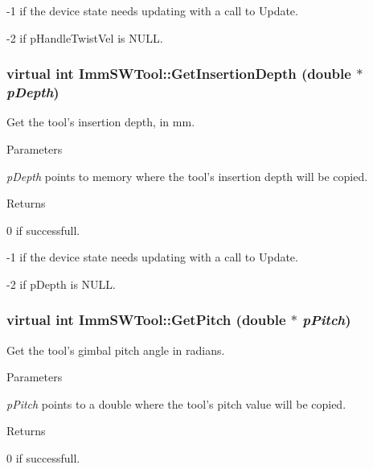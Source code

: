 -\/1 if the device state needs updating with a call to Update.

-\/2 if pHandleTwistVel is NULL. \hypertarget{classImmSWTool_ad51506f94f40337033fb62afd199005b}{
\subsubsection[{GetInsertionDepth}]{\setlength{\rightskip}{0pt plus 5cm}virtual int ImmSWTool::GetInsertionDepth (double $\ast$ {\em pDepth})}}
\label{classImmSWTool_ad51506f94f40337033fb62afd199005b}
Get the tool's insertion depth, in mm.


\begin{DoxyParams}{Parameters}
\item[{\em pDepth}]points to memory where the tool's insertion depth will be copied.\end{DoxyParams}
\begin{DoxyReturn}{Returns}

\end{DoxyReturn}
0 if successfull.

-\/1 if the device state needs updating with a call to Update.

-\/2 if pDepth is NULL. \hypertarget{classImmSWTool_a6e0a696c62eb9b0ee26bbc81d22f1265}{
\subsubsection[{GetPitch}]{\setlength{\rightskip}{0pt plus 5cm}virtual int ImmSWTool::GetPitch (double $\ast$ {\em pPitch})}}
\label{classImmSWTool_a6e0a696c62eb9b0ee26bbc81d22f1265}
Get the tool's gimbal pitch angle in radians.


\begin{DoxyParams}{Parameters}
\item[{\em pPitch}]points to a double where the tool's pitch value will be copied.\end{DoxyParams}
\begin{DoxyReturn}{Returns}

\end{DoxyReturn}
0 if successfull.

